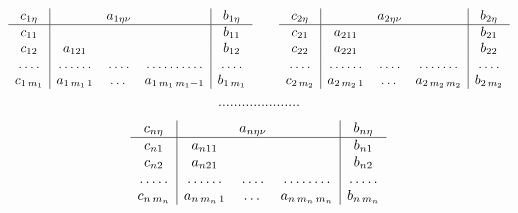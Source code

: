 \begin{eqnarray*}


\begin{array}{c|ccc|c}


c_{1\eta} & & a_{1\eta\nu} & & b_{1\eta}\\


\hline


c_{11} & & & & b_{11} \\


c_{12} &a_{121} & & & b_{12} \\


\dotfill &\dotfill &\dotfill &\dotfill &\dotfill \\


c_{1\,m_{1}}&a_{1\,m_{1}\,1}&\dotsc & a_{1\,m_{1}\,m_{1}-1}


& b_{1\,m_{1}} 


\end{array}


\qquad


%


\begin{array}{c|ccc|c}


c_{2\eta} & & a_{2\eta\nu} & & b_{2\eta}\\


\hline


c_{21} & a_{211}& & & b_{21} \\


c_{22} &a_{221} & & & b_{22} \\


\dotfill &\dotfill &\dotfill &\dotfill &\dotfill \\


c_{2\,m_{2}}&a_{2\,m_{2}\,1}&\dotsc & a_{2\,m_{2}\,m_{2}}


& b_{2\,m_{2}}


\end{array}


\end{eqnarray*}


%


$$\dotsc\dotsc\dotsc\dotsc\dotsc\dotsc\dotsc $$


%


\begin{eqnarray*}


\begin{array}{c|ccc|c}


c_{n\eta} & & a_{n\eta\nu} & & b_{n\eta}\\


\hline


c_{n1} & a_{n11}& & & b_{n1} \\


c_{n2} &a_{n21} & & & b_{n2} \\


\dotfill &\dotfill &\dotfill &\dotfill &\dotfill \\


c_{n\,m_{n}}&a_{n\,m_{n}\,1}&\dotsc & a_{n\,m_{n}\,m_{n}}


& b_{n\,m_{n}}


\end{array}


\end{eqnarray*}



